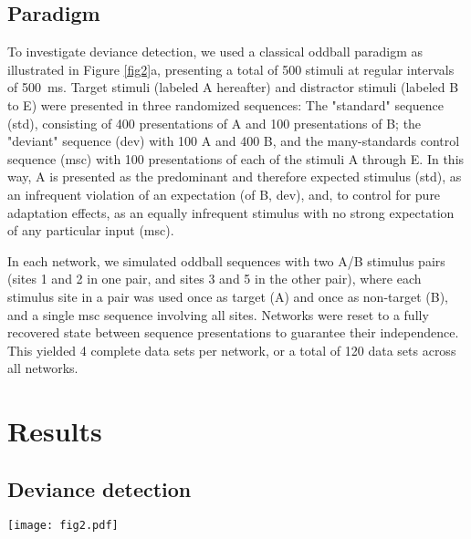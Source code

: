 \documentclass[pdflatex,referee,iicol,sn-basic]{sn-jnl}
\theoremstyle{thmstyleone}%
\theoremstyle{thmstyletwo}%
\theoremstyle{thmstylethree}%
\begin{document}
\subsection{Paradigm}\label{sec-paradigm}

To investigate deviance detection, we used a classical oddball paradigm as illustrated in Figure \ref{fig2}a, presenting a total of 500 stimuli at regular intervals of 500~ms. Target stimuli (labeled A hereafter) and distractor stimuli (labeled B to E) were presented in three randomized sequences: The "standard" sequence (std), consisting of 400 presentations of A and 100 presentations of B; the "deviant" sequence (dev) with 100 A and 400 B, and the many-standards control sequence (msc) with 100 presentations of each of the stimuli A through E. In this way, A is presented as the predominant and therefore expected stimulus (std), as an infrequent violation of an expectation (of B, dev), and, to control for pure adaptation effects, as an equally infrequent stimulus with no strong expectation of any particular input (msc).

In each network, we simulated oddball sequences with two A/B stimulus pairs (sites 1 and 2 in one pair, and sites 3 and 5 in the other pair), where each stimulus site in a pair was used once as target (A) and once as non-target (B), and a single msc sequence involving all sites. Networks were reset to a fully recovered state between sequence presentations to guarantee their independence. This yielded 4 complete data sets per network, or a total of 120 data sets across all networks.

\section{Results}\label{sec-results}

\subsection{Deviance detection}\label{sec-dd}

\begin{figure*}%
    \centering
    \texttt{[image: fig2.pdf]}
    \caption{\textbf{a} Illustration of the oddball paradigm used. Each square represents a stimulus, with the target (A) in dark blue, and other stimuli in lighter colors. The temporal extent of stimulation is exaggerated; in reality, stimulation was delivered in a single time step, and the response allowed to develop freely for 500 ms. \textbf{b} Response of a neuronal cell culture in vitro, adapted from \cite{Kubota2021-dx}. \textbf{c} Model response, showing average network-wide spike counts after stimulation with target (A) in each sequence. \textbf{d} Mismatch, SSA and deviance detection indices across networks and stimulus pairs (n = 120). In this and later figures, notches indicate the confidence interval for the median, calculated by bootstrap with 10000 iterations. All indices were positive (mismatch: t = 11, p = 6.7e-21, SSA: t = 7.8, p = 1.05e-12, deviance detection: t = 6.5, p = 1.05e-09)}
    \label{fig2}
\end{figure*}
\end{document}
